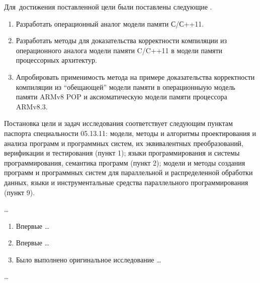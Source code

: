 Для~достижения поставленной цели были поставлены следующие {\tasks}.
\begin{enumerate}
  \item Разработать операционный аналог модели памяти С/С++11.
  \item Разработать методы для доказательства корректности компиляции из операционного аналога модели памяти C/C++11 в модели памяти
        процессорных архитектур.
  \item Апробировать применимость метода на примере доказательства корректности компиляции из ``обещающей'' модели памяти в
        операционныую модель памяти ARMv8 POP и аксиоматическую модели памяти процессора ARMv8.3.
\end{enumerate}

Постановка цели и задач исследования соответствует следующим пунктам паспорта специальности 05.13.11:
модели, методы и алгоритмы проектирования и анализа программ и программных систем, их эквивалентных преобразований, верификации и тестирования (пункт 1);
языки программирования и системы программирования, семантика программ (пункт 2);
модели и методы создания программ и программных систем для параллельной и распределенной обработки данных,
языки и инструментальные средства параллельного программирования (пункт 9).

{\methods} \ldots

{\novelty}
\begin{enumerate}
  \item Впервые \ldots
  \item Впервые \ldots
  \item Было выполнено оригинальное исследование \ldots
\end{enumerate}

{\influence} \ldots

